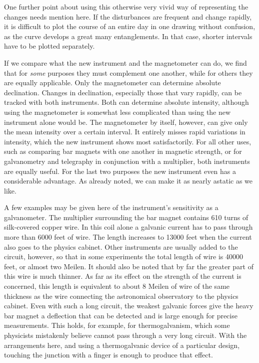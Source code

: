 One further point about using this otherwise very vivid way of representing the changes needs mention here. If the disturbances are frequent and change rapidly, it is difficult to plot the course of an entire day in one drawing without confusion, as the curve develops a great many entanglements. In that case, shorter intervals have to be plotted separately.

If we compare what the new instrument and the magnetometer can do, we find that for \textit{some} purposes they must complement one another, while for others they are equally applicable. Only the magnetometer can determine absolute declination. Changes in declination, especially those that vary rapidly, can be tracked with both instruments. Both can determine absolute intensity, although using the magnetometer is somewhat less complicated than using the new instrument alone would be. The magnetometer by itself, however, can give only the mean intensity over a certain interval. It entirely misses rapid variations in intensity, which the new instrument shows most satisfactorily. For all other uses, such as comparing bar magnets with one another in magnetic strength, or for galvanometry and telegraphy in conjunction with a multiplier, both instruments are equally useful. For the last two purposes the new instrument even has a considerable advantage. As already noted, we can make it as nearly astatic as we like.

A few examples may be given here of the instrument’s sensitivity as a galvanometer. The multiplier surrounding the bar magnet contains 610 turns of silk-covered copper wire. In this coil alone a galvanic current has to pass through more than 6000 feet of wire. The length increases to 13000 feet when the current also goes to the physics cabinet. Other instruments are usually added to the circuit, however, so that in some experiments the total length of wire is 40000 feet, or almost two Meilen. It should also be noted that by far the greater part of this wire is much thinner. As far as its effect on the strength of the current is concerned, this length is equivalent to about 8 Meilen of wire of the same thickness as the wire connecting the astronomical observatory to the physics cabinet. Even with such a long circuit, the weakest galvanic forces give the heavy bar magnet a deflection that can be detected and is large enough for precise measurements. This holds, for example, for thermogalvanism, which some physicists mistakenly believe cannot pass through a very long circuit. With the arrangements here, and using a thermogalvanic device of a particular design, touching the junction with a finger is enough to produce that effect.

